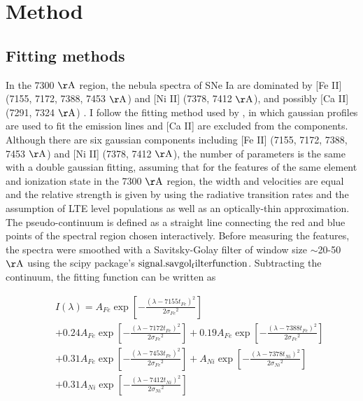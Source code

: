 \documentclass[twocolumn]{aastex631}
\begin{document}
\section{Method} \label{sec:method}

\subsection{Fitting methods \label{subsec:fitting}}

In the 7300 $\rm \AA$ region, the nebula spectra of SNe Ia are dominated by [Fe II] (7155, 7172, 7388, 7453 $\rm \AA$) and [Ni II] (7378, 7412 $\rm \AA$), and possibly [Ca II] (7291, 7324 $\rm \AA$) \citep{2018MNRAS.477.3567M}. I follow the fitting method used by \citet{2018MNRAS.477.3567M}, in which gaussian profiles are used to fit the emission lines and [Ca II] are excluded from the components. Although there are six gaussian components including [Fe II] (7155, 7172, 7388, 7453 $\rm \AA$) and [Ni II] (7378, 7412 $\rm \AA$), the number of parameters is the same with a double gaussian fitting, assuming that for the features of the same element and ionization state in the 7300 $\rm \AA$ region, the width and velocities are equal and the relative strength is given by \citet{2015AA...573A..12J} using the radiative transition rates and the assumption of LTE level populations as well as an optically-thin approximation. The pseudo-continuum is defined as a straight line connecting the red and blue points of the spectral region chosen interactively. Before measuring the features, the spectra were smoothed with a Savitsky-Golay filter of window size $\sim$20-50 $\rm \AA$ using the scipy package’s $\rm signal.savgol_filter function$. Subtracting the continuum, the fitting function can be written as
\begin{small}
\begin{eqnarray}
 \nonumber
&&I\left(\lambda\right)=A_{Fe}\exp{\left[-\frac{\left(\lambda-7155t_{Fe}\right)^2}{2{\sigma_{Fe}}^2}\right]}\\  \nonumber
&&+0.24A_{Fe}\exp{\left[-\frac{\left(\lambda-7172t_{Fe}\right)^2}{2{\sigma_{Fe}}^2}\right]}
+{0.19A}_{Fe}\exp{\left[-\frac{\left(\lambda-7388t_{Fe}\right)^2}{2{\sigma_{Fe}}^2}\right]}\\  \nonumber
&&+{0.31A}_{Fe}\exp{\left[-\frac{\left(\lambda-7453t_{Fe}\right)^2}{2{\sigma_{Fe}}^2}\right]}
+A_{Ni}\exp{\left[-\frac{\left(\lambda-7378t_{Ni}\right)^2}{2{\sigma_{Ni}}^2}\right]}\\ 
&&+0.31A_{Ni}\exp{\left[-\frac{\left(\lambda-7412t_{Ni}\right)^2}{2{\sigma_{Ni}}^2}\right]}
\end{eqnarray}
\end{small}
\end{document}
